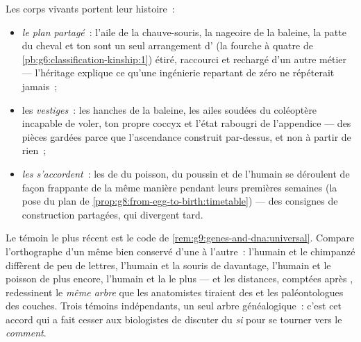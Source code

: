 \begin{proposition}\label{prop:g9:evidence-of-evolution:anatomy}
Les corps vivants portent leur histoire~:
\begin{itemize}
  \item \emph{le plan partagé}~: l'aile de la chauve-souris,
        la nageoire de la baleine, la patte du cheval et
        ton  sont un seul arrangement d' (la
        fourche à quatre  de
        \cref{pb:g6:classification-kinship:1}) étiré,
        raccourci et rechargé d'un autre métier ---
        l'héritage explique ce qu'une ingénierie repartant
        de zéro ne répéterait jamais~;
  \item les \emph{vestiges}~: les hanches de la baleine,
        les ailes soudées du coléoptère incapable de voler,
        ton propre coccyx et l'état rabougri de
        l'appendice --- des pièces gardées parce que
        l'ascendance construit par-dessus, et non à partir
        de rien~;
  \item \emph{les  s'accordent}~: les  de
         du poisson, du poussin et de l'humain se
        déroulent de façon frappante de la même manière
        pendant leurs premières semaines (la pose du plan
        de \cref{prop:g8:from-egg-to-birth:timetable}) ---
        des consignes de construction partagées, qui
        divergent tard.
\end{itemize}
\end{proposition}
\admitted

\begin{proposition}\label{prop:g9:evidence-of-evolution:molecules}
Le témoin le plus récent est le code de
\cref{rem:g9:genes-and-dna:universal}. Compare l'orthographe
d'un même  bien conservé d'une  à l'autre~:
l'humain et le chimpanzé diffèrent de peu de lettres,
l'humain et la souris de davantage, l'humain et le poisson
de plus encore, l'humain et la  le plus --- et les
distances, comptées  après , redessinent le
\emph{même arbre} que les anatomistes tiraient des  et les
paléontologues des couches. Trois témoins indépendants, un
seul arbre généalogique~: c'est cet accord qui a fait cesser
aux biologistes de discuter du \emph{si} pour se tourner
vers le \emph{comment}.
\end{proposition}
\admitted

